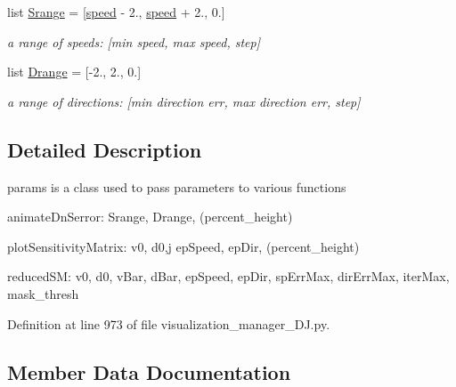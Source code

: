 \begin{DoxyCompactItemize}
list \mbox{\hyperlink{classvisualization__manager___d_j_1_1_visualization_manager_1_1params_a35c7f4aed6589385a5a87fca11b55a90}{Srange}} = \mbox{[}\mbox{\hyperlink{classvisualization__manager___d_j_1_1_visualization_manager_1_1params_af67bd6887a2486bd05116fca8ecbfe08}{speed}} -\/ 2., \mbox{\hyperlink{classvisualization__manager___d_j_1_1_visualization_manager_1_1params_af67bd6887a2486bd05116fca8ecbfe08}{speed}} + 2., 0.\mbox{]}
\begin{DoxyCompactList}\small\item\em a range of speeds\+: \mbox{[}min speed, max speed, step\mbox{]} \end{DoxyCompactList}\item 
list \mbox{\hyperlink{classvisualization__manager___d_j_1_1_visualization_manager_1_1params_af481a6429601c114aa05567f4c169ac1}{Drange}} = \mbox{[}-\/2., 2., 0.\mbox{]}
\begin{DoxyCompactList}\small\item\em a range of directions\+: \mbox{[}min direction err, max direction err, step\mbox{]} \end{DoxyCompactList}\end{DoxyCompactItemize}


\subsection{Detailed Description}
params is a class used to pass parameters to various functions 

animate\+Dn\+Serror\+: Srange, Drange, (percent\+\_\+height)

plot\+Sensitivity\+Matrix\+: v0, d0,j ep\+Speed, ep\+Dir, (percent\+\_\+height)

reduced\+SM\+: v0, d0, v\+Bar, d\+Bar, ep\+Speed, ep\+Dir, sp\+Err\+Max, dir\+Err\+Max, iter\+Max, mask\+\_\+thresh 

Definition at line 973 of file visualization\+\_\+manager\+\_\+\+D\+J.\+py.



\subsection{Member Data Documentation}
\mbox{\label{classvisualization__manager___d_j_1_1_visualization_manager_1_1params_ae89c909d412f7f049eeee5203416f69e}} 
